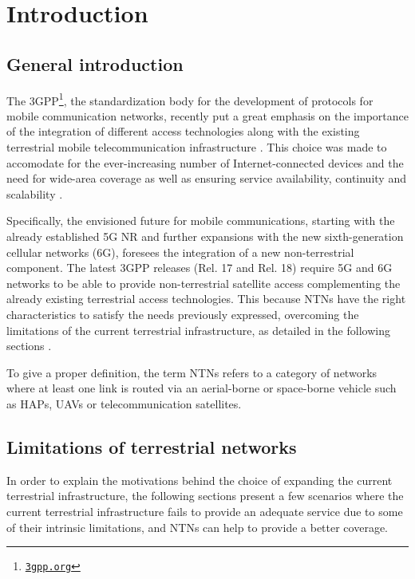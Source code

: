 
\chapter{Introduction}
\label{chp:intro}

\section{General introduction}
The \ac{3GPP}\footnote{\href{https://www.3gpp.org}{\texttt{3gpp.org}}}, the standardization body for the development of protocols for mobile communication networks, recently put a great emphasis on the importance of the integration of different access technologies along with the existing terrestrial mobile telecommunication infrastructure \cite{3gpp-tr-21.917}. This choice was made to accomodate for the ever-increasing number of Internet-connected devices and the need for wide-area coverage as well as ensuring service availability, continuity and scalability \cite{ntn-survey-rinaldi}.

Specifically, the envisioned future for mobile communications, starting with the already established 5G \ac{NR} and further expansions with the new sixth-generation cellular networks (6G), foresees the integration of a new non-terrestrial component. The latest \ac{3GPP} releases (Rel. 17 and Rel. 18) require 5G and 6G networks to be able to provide non-terrestrial satellite access complementing the already existing terrestrial access technologies. This because \ac{NTN}s have the right characteristics to satisfy the needs previously expressed, overcoming the limitations of the current terrestrial infrastructure, as detailed in the following sections \cite{overview-rel-17-18-saad, 5g-nr-communication-geo-leo-maattanen}.

To give a proper definition, the term \ac{NTNs} refers to a category of networks where at least one link is routed via an aerial-borne or space-borne vehicle such as \ac{HAPs}, \ac{UAVs} or telecommunication satellites.

\section{Limitations of terrestrial networks}
In order to explain the motivations behind the choice of expanding the current terrestrial infrastructure, the following sections present a few scenarios where the current terrestrial infrastructure fails to provide an adequate service due to some of their intrinsic limitations, and \ac{NTNs} can help to provide a better coverage.

